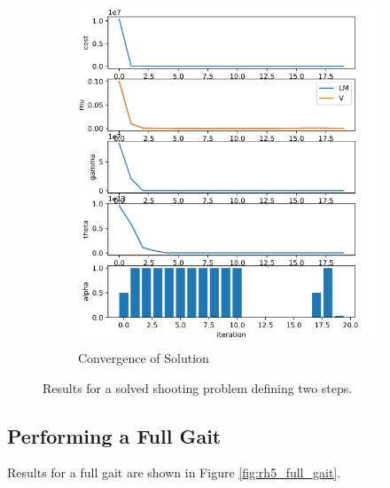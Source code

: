 \begin{figure}[h!]
\begin{subfigure}{.4\textwidth}
  \includegraphics[width=1\linewidth]{Media/Crocoddyl/RH5/2Steps/RH52Steps_Convergence.png}
  \caption{Convergence of Solution}
\end{subfigure}
\caption{Results for a solved shooting problem defining two steps.}
\label{fig:rh5_two_steps}
\centering
\end{figure}

\subsection{Performing a Full Gait}
Results for a full gait are shown in Figure \ref{fig:rh5_full_gait}.

